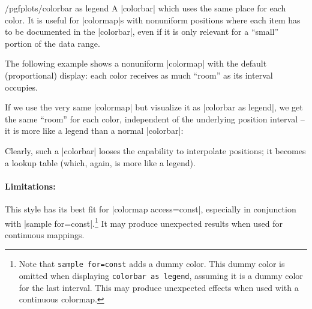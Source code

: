 \begin{stylekey}{/pgfplots/colorbar as legend}
    A |colorbar| which uses the same place for each color. It is useful for
    |colormap|s with nonuniform positions where each item has to be documented
    in the |colorbar|, even if it is only relevant for a ``small'' portion of
    the data range.

    The following example shows a nonuniform |colormap| with the default
    (proportional) display: each color receives as much ``room'' as its
    interval occupies.
\begin{codeexample}[]
\pgfplotscolorbardrawstandalone[
    colorbar style={
        ticklabel style={font=\tiny},
    },
    colormap access=const,
    colormap={CM}{
        of colormap={
            viridis,
            target pos={
                0,200,300,350,375,
                400,700,800,850,1000
            },
            sample for=const,
        },
    },
]
\end{codeexample}

    If we use the very same |colormap| but visualize it as
    |colorbar as legend|, we get the same ``room'' for each color, independent
    of the underlying position interval -- it is more like a legend than a
    normal |colorbar|:
\begin{codeexample}[]
\pgfplotscolorbardrawstandalone[
    colorbar as legend,
    colorbar style={
        ticklabel style={font=\tiny},
    },
    colormap access=const,
    colormap={CM}{
        of colormap={
            viridis,
            target pos={
                0,200,300,350,375,
                400,700,800,850,1000
            },
            sample for=const,
        },
    },
]
\end{codeexample}
    \noindent Clearly, such a |colorbar| looses the capability to interpolate
    positions; it becomes a lookup table (which, again, is more like a legend).


    \paragraph{Limitations:}

    This style has its best fit for |colormap access=const|, especially in
    conjunction with |sample for=const|.\footnote{Note that \texttt{sample
    for=const} adds a dummy color. This dummy color is omitted when displaying
    \texttt{colorbar as legend}, assuming it is a dummy color for the last
    interval. This may produce unexpected effects when used with a continuous
    colormap.} It may produce unexpected results when used for continuous
    mappings.
\end{stylekey}


